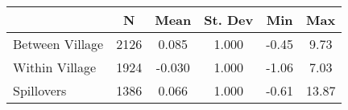 \begin{tabular}{l*{5}{c}}\hline&\multicolumn{1}{c}{N}&\multicolumn{1}{c}{Mean}&\multicolumn{1}{c}{St. Dev}&\multicolumn{1}{c}{Min}&\multicolumn{1}{c}{Max}\\ \hline 
Between Village & 2126 & 0.085 & 1.000 & -0.45 & 9.73 \\
Within Village & 1924 & -0.030 & 1.000 & -1.06 & 7.03 \\
Spillovers & 1386 & 0.066 & 1.000 & -0.61 & 13.87 \\
\hline \end{tabular}
